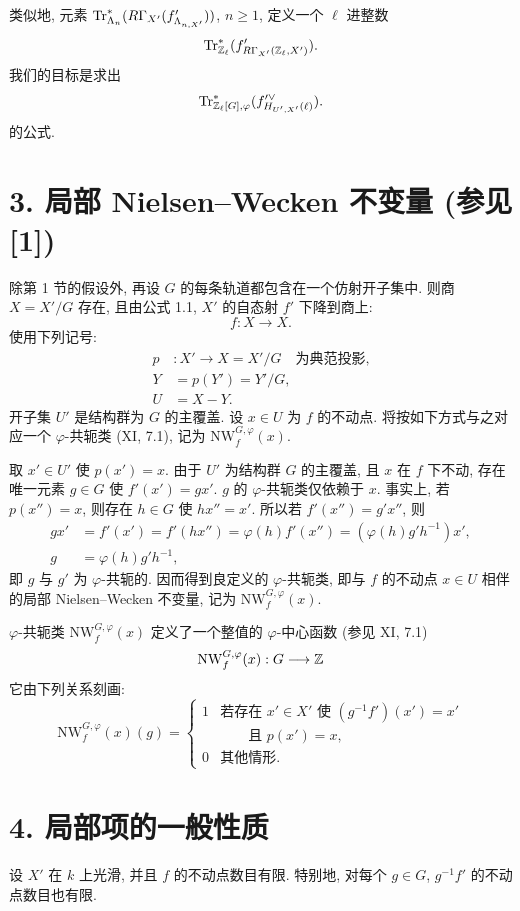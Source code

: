 类似地, 元素 $\operatorname{Tr}^*_{\Lambda_n}(R\Gamma_{X'}(f'_{\Lambda_{n,X'}}))$, $n\ge1$, 定义一个 $\ell$ 进整数
\[
\operatorname{Tr}^*_{\mathbb Z_\ell}(f'_{R\Gamma_{X'}(\mathbb Z_\ell,X')}).
\]
我们的目标是求出
\[
\operatorname{Tr}^*_{\mathbb Z_\ell[G],\varphi}(f'^\vee_{H_{U',X'}(\ell)}).
\]
的公式.
\section*{3. 局部 Nielsen--Wecken 不变量 (参见 [1])}
除第 1 节的假设外, 再设 $G$ 的每条轨道都包含在一个仿射开子集中. 则商 $X=X'/G$ 存在, 且由公式 1.1, $X'$ 的自态射 $f'$ 下降到商上:
\[
f:X\longrightarrow X .
\]
使用下列记号:
\begin{align*}
p &: X'\longrightarrow X=X'/G\quad \text{为典范投影,}\\
Y&=p(Y')=Y'/G,\\
U&=X-Y.
\end{align*}
开子集 $U'$ 是结构群为 $G$ 的主覆盖. 设 $x\in U$ 为 $f$ 的不动点. 将按如下方式与之对应一个 $\varphi$-共轭类 (XI, 7.1), 记为 $\mathrm{NW}_{f}^{G,\varphi}(x)$.

取 $x'\in U'$ 使 $p(x')=x$. 由于 $U'$ 为结构群 $G$ 的主覆盖, 且 $x$ 在 $f$ 下不动, 存在唯一元素 $g\in G$ 使 $f'(x')=gx'$. $g$ 的 $\varphi$-共轭类仅依赖于 $x$. 事实上, 若 $p(x'')=x$, 则存在 $h\in G$ 使 $hx''=x'$. 所以若 $f'(x'')=g'x''$, 则
\begin{align*}
gx'&=f'(x')=f'(hx'')=\varphi(h)f'(x'')=(\varphi(h)g'h^{-1})x',\\
g&=\varphi(h)g'h^{-1},
\end{align*}
即 $g$ 与 $g'$ 为 $\varphi$-共轭的. 因而得到良定义的 $\varphi$-共轭类, 即与 $f$ 的不动点 $x\in U$ 相伴的局部 Nielsen--Wecken 不变量, 记为 $\mathrm{NW}_{f}^{G,\varphi}(x)$.

$\varphi$-共轭类 $\mathrm{NW}_{f}^{G,\varphi}(x)$ 定义了一个整值的 $\varphi$-中心函数 (参见 XI, 7.1)
\[
\mathrm{NW}_{f}^{G,\varphi}(x):G\longrightarrow \mathbb Z
\]
它由下列关系刻画:
\begin{equation}\tag{3.1}
\mathrm{NW}_{f}^{G,\varphi}(x)(g)=
\begin{cases}
1&\text{若存在 }x'\in X'\text{ 使 }(g^{-1}f')(x')=x'\\
 &\qquad\text{且 }p(x')=x,\\
0&\text{其他情形.}
\end{cases}
\end{equation}

\section*{4. 局部项的一般性质}
设 $X'$ 在 $k$ 上光滑, 并且 $f$ 的不动点数目有限. 特别地, 对每个 $g\in G$, $g^{-1}f'$ 的不动点数目也有限.


